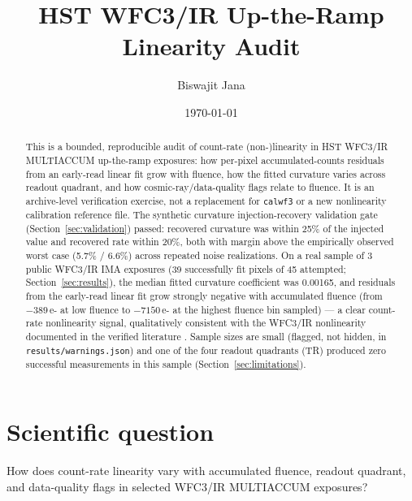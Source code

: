 \documentclass[11pt]{article}
\title{HST WFC3/IR Up-the-Ramp Linearity Audit}
\author{Biswajit Jana}
\date{\today}
\begin{document}
\maketitle

\begin{abstract}
This is a bounded, reproducible audit of count-rate (non-)linearity in HST
WFC3/IR MULTIACCUM up-the-ramp exposures: how per-pixel accumulated-counts
residuals from an early-read linear fit grow with fluence, how the fitted
curvature varies across readout quadrant, and how cosmic-ray/data-quality
flags relate to fluence. It is an archive-level verification exercise, not a
replacement for \texttt{calwf3} or a new nonlinearity calibration reference
file. The synthetic curvature injection-recovery validation gate
(Section~\ref{sec:validation}) passed: recovered curvature was within 25\% of
the injected value and recovered rate within 20\%, both with margin above the
empirically observed worst case (5.7\% / 6.6\%) across repeated noise
realizations. On a real sample of 3 public WFC3/IR IMA exposures (39
successfully fit pixels of 45 attempted; Section~\ref{sec:results}), the
median fitted curvature coefficient was 0.00165, and residuals from the
early-read linear fit grow strongly negative with accumulated fluence
(from $-389$\,e- at low fluence to $-7150$\,e- at the highest fluence bin
sampled) --- a clear count-rate nonlinearity signal, qualitatively consistent
with the WFC3/IR nonlinearity documented in the verified literature
\citep{Huynh2026NonlinearityWFC3IR}. Sample sizes are small (flagged, not
hidden, in \texttt{results/warnings.json}) and one of the four readout
quadrants (TR) produced zero successful measurements in this sample
(Section~\ref{sec:limitations}).
\end{abstract}

\section{Scientific question}
How does count-rate linearity vary with accumulated fluence, readout
quadrant, and data-quality flags in selected WFC3/IR MULTIACCUM exposures?
\end{document}
